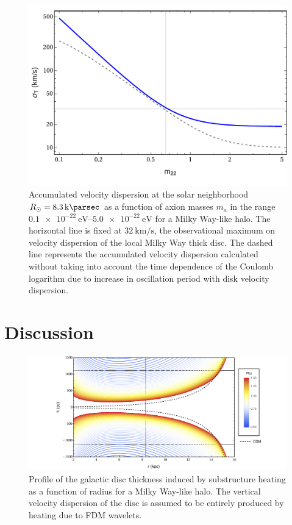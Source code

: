 \documentclass[usenatbib]{mnras}
\begin{document}
\begin{figure}
\includegraphics[width=\columnwidth]{FDM_mass_dep}
\vspace*{-5mm}
\caption{Accumulated velocity dispersion at the solar neighborhood $R_{\odot} = \SI{8.3}{\kilo\parsec}$ as a function of axion masses $m_{a}$ in the range $\SIrange{0.1 e-22}{5.0 e-22}{\electronvolt}$ for a Milky Way-like halo. The horizontal line is fixed at $\SI{32}{\kilo\meter\per\second}$, the observational maximum on velocity dispersion of the local Milky Way thick disc. The dashed line represents the accumulated velocity dispersion calculated without taking into account the time dependence of the Coulomb logarithm due to increase in oscillation period with disk velocity dispersion.}
\label{fig:mass_dep_heating}
\end{figure}

\section{Discussion}

\begin{figure}
\includegraphics[width=18cm]{disk_shape}
\vspace*{-5mm}
\caption{Profile of the galactic disc thickness induced by substructure heating as a function of radius for a Milky Way-like halo. The vertical velocity dispersion of the disc is assumed to be entirely produced by heating due to FDM wavelets. }
\label{fig:disc_shape_FDM}
\end{figure}
\end{document}
